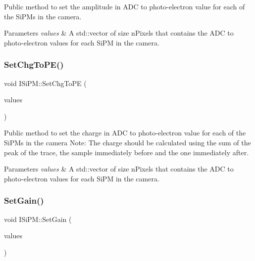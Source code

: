 Public method to set the amplitude in A\+DC to photo-\/electron value for each of the Si\+P\+Ms in the camera. 


\begin{DoxyParams}{Parameters}
{\em values} & A std\+::vector of size n\+Pixels that contains the A\+DC to photo-\/electron values for each Si\+PM in the camera. \\
\hline
\end{DoxyParams}
\mbox{\label{classISiPM_a7f96e36528e099f75a32d54133917ca8}} 
\subsubsection{\texorpdfstring{Set\+Chg\+To\+P\+E()}{SetChgToPE()}}
{\footnotesize\ttfamily void I\+Si\+P\+M\+::\+Set\+Chg\+To\+PE (\begin{DoxyParamCaption}\item[{std\+::vector$<$ double $>$}]{values }\end{DoxyParamCaption})}



Public method to set the charge in A\+DC to photo-\/electron value for each of the Si\+P\+Ms in the camera Note\+: The charge should be calculated using the sum of the peak of the trace, the sample immediately before and the one immediately after. 


\begin{DoxyParams}{Parameters}
{\em values} & A std\+::vector of size n\+Pixels that contains the A\+DC to photo-\/electron values for each Si\+PM in the camera. \\
\hline
\end{DoxyParams}
\mbox{\label{classISiPM_acc5ee63d1ff626fa22d5f522005ca289}} 
\subsubsection{\texorpdfstring{Set\+Gain()}{SetGain()}}
{\footnotesize\ttfamily void I\+Si\+P\+M\+::\+Set\+Gain (\begin{DoxyParamCaption}\item[{std\+::vector$<$ double $>$}]{values }\end{DoxyParamCaption})}



